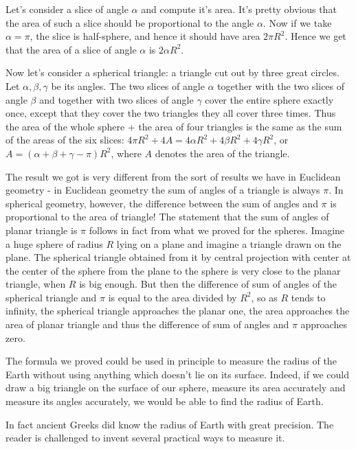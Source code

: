 Let's consider a slice of angle $\alpha$ and compute it's area. It's pretty obvious that the area of such a slice should be proportional to the angle $\alpha$. Now if we take $\alpha=\pi$, the slice is half-sphere, and hence it should have area $2\pi R^2$. Hence we get that the area of a slice of angle $\alpha$ is $2\alpha R^2$.

Now let's consider a spherical triangle: a triangle cut out by three great circles. Let $\alpha,\beta,\gamma$ be its angles. The two slices of angle $\alpha$ together with the two slices of angle $\beta$ and together with two slices of angle $\gamma$ cover the entire sphere exactly once, except that they cover the two triangles they all cover three times. Thus the area of the whole sphere + the area of four triangles is the same as the sum of the areas of the six slices: $4\pi R^2+4A=4\alpha R^2+4\beta R^2+4\gamma R^2$, or $A=(\alpha+\beta+\gamma - \pi)R^2$, where $A$ denotes the area of the triangle.

The result we got is very different from the sort of results we have in Euclidean geometry - in Euclidean geometry the sum of angles of a triangle is always $\pi$. In spherical geometry, however, the difference between the sum of angles and $\pi$ is proportional to the area of triangle! The statement that the sum of angles of planar triangle is $\pi$ follows in fact from what we proved for the spheres. Imagine a huge sphere of radius $R$ lying on a plane and imagine a triangle drawn on the plane. The spherical triangle obtained from it by central projection with center at the center of the sphere from the plane to the sphere is very close to the planar triangle, when $R$ is big enough. But then the difference of sum of angles of the spherical triangle and $\pi$ is equal to the area divided by $R^2$, so as $R$ tends to infinity, the spherical triangle approaches the planar one, the area approaches the area of planar triangle and thus the difference of sum of angles and $\pi$ approaches zero.

The formula we proved could be used in principle to measure the radius of the Earth without using anything which doesn't lie on its surface. Indeed, if we could draw a big triangle on the surface of our sphere, measure its area accurately and measure its angles accurately, we would be able to find the radius of Earth.

In fact ancient Greeks did know the radius of Earth with great precision. The reader is challenged to invent several practical ways to measure it.

